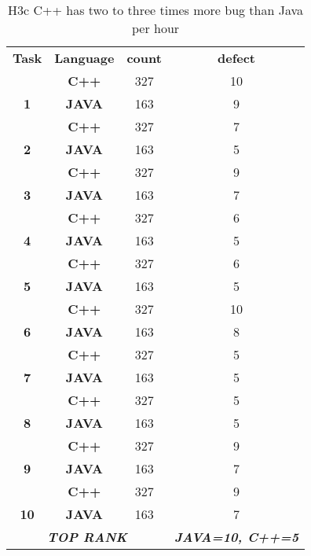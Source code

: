 \begin{table}
\scriptsize
\centering
\caption{H3c C++ has two to three times more bug than Java per hour}
\label{tab:h3c}
\begin{tabular}{cccc}
\textbf{Task} & \textbf{Language} & \textbf{count} & \textbf{defect} \\
 & \textbf{C++} & 327 & \cellcolor[HTML]{C0C0C0}10 \\
\multirow{-2}{*}{\textbf{1}} & \textbf{JAVA} & 163 & \cellcolor[HTML]{C0C0C0}9 \\
 & \textbf{C++} & 327 & 7 \\
\multirow{-2}{*}{\textbf{2}} & \textbf{JAVA} & 163 & \cellcolor[HTML]{C0C0C0}5 \\
 & \textbf{C++} & 327 & 9 \\
\multirow{-2}{*}{\textbf{3}} & \textbf{JAVA} & 163 & \cellcolor[HTML]{C0C0C0}7 \\
 & \textbf{C++} & 327 & \cellcolor[HTML]{C0C0C0}6 \\
\multirow{-2}{*}{\textbf{4}} & \textbf{JAVA} & 163 & \cellcolor[HTML]{C0C0C0}5 \\
 & \textbf{C++} & 327 & 6 \\
\multirow{-2}{*}{\textbf{5}} & \textbf{JAVA} & 163 & \cellcolor[HTML]{C0C0C0}5 \\
 & \textbf{C++} & 327 & \cellcolor[HTML]{C0C0C0}10 \\
\multirow{-2}{*}{\textbf{6}} & \textbf{JAVA} & 163 & \cellcolor[HTML]{C0C0C0}8 \\
 & \textbf{C++} & 327 & \cellcolor[HTML]{C0C0C0}5 \\
\multirow{-2}{*}{\textbf{7}} & \textbf{JAVA} & 163 & \cellcolor[HTML]{C0C0C0}5 \\
 & \textbf{C++} & 327 & \cellcolor[HTML]{C0C0C0}5 \\
\multirow{-2}{*}{\textbf{8}} & \textbf{JAVA} & 163 & \cellcolor[HTML]{C0C0C0}5 \\
 & \textbf{C++} & 327 & 9 \\
\multirow{-2}{*}{\textbf{9}} & \textbf{JAVA} & 163 & \cellcolor[HTML]{C0C0C0}7 \\
 & \textbf{C++} & 327 & 9 \\
\multirow{-2}{*}{\textbf{10}} & \textbf{JAVA} & 163 & \cellcolor[HTML]{C0C0C0}7 \\
\multicolumn{3}{c}{\textit{\textbf{TOP RANK}}} & \textit{\textbf{JAVA=10, C++=5}}
\end{tabular}
\end{table}

